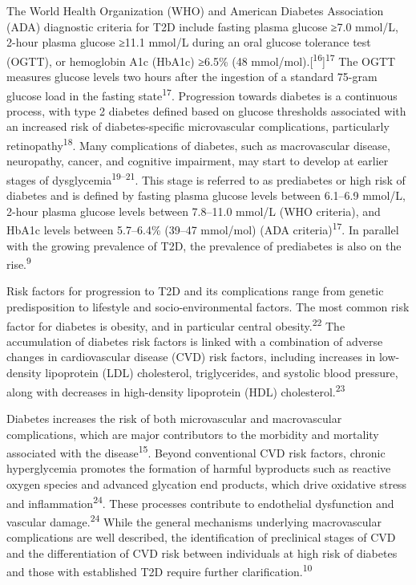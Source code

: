 \documentclass[
  letterpaper,
  headsepline=true,
  open=any]{scrbook}
\begin{document}
The World Health Organization (WHO) and American Diabetes Association
(ADA) diagnostic criteria for T2D include fasting plasma glucose ≥7.0
mmol/L, 2-hour plasma glucose ≥11.1 mmol/L during an oral glucose
tolerance test (OGTT), or hemoglobin A1c (HbA1c) ≥6.5\% (48
mmol/mol).{[}\textsuperscript{16}{]}\textsuperscript{17} The OGTT
measures glucose levels two hours after the ingestion of a standard
75-gram glucose load in the fasting state\textsuperscript{17}.
Progression towards diabetes is a continuous process, with type 2
diabetes defined based on glucose thresholds associated with an
increased risk of diabetes-specific microvascular complications,
particularly retinopathy\textsuperscript{18}. Many complications of
diabetes, such as macrovascular disease, neuropathy, cancer, and
cognitive impairment, may start to develop at earlier stages of
dysglycemia\textsuperscript{19--21}. This stage is referred to as
prediabetes or high risk of diabetes and is defined by fasting plasma
glucose levels between 6.1--6.9 mmol/L, 2-hour plasma glucose levels
between 7.8--11.0 mmol/L (WHO criteria), and HbA1c levels between
5.7--6.4\% (39--47 mmol/mol) (ADA criteria)\textsuperscript{17}. In
parallel with the growing prevalence of T2D, the prevalence of
prediabetes is also on the rise.\textsuperscript{9}

Risk factors for progression to T2D and its complications range from
genetic predisposition to lifestyle and socio-environmental factors. The
most common risk factor for diabetes is obesity, and in particular
central obesity.\textsuperscript{22} The accumulation of diabetes risk
factors is linked with a combination of adverse changes in
cardiovascular disease (CVD) risk factors, including increases in
low-density lipoprotein (LDL) cholesterol, triglycerides, and systolic
blood pressure, along with decreases in high-density lipoprotein (HDL)
cholesterol.\textsuperscript{23}

Diabetes increases the risk of both microvascular and macrovascular
complications, which are major contributors to the morbidity and
mortality associated with the disease\textsuperscript{15}. Beyond
conventional CVD risk factors, chronic hyperglycemia promotes the
formation of harmful byproducts such as reactive oxygen species and
advanced glycation end products, which drive oxidative stress and
inflammation\textsuperscript{24}. These processes contribute to
endothelial dysfunction and vascular damage.\textsuperscript{24} While
the general mechanisms underlying macrovascular complications are well
described, the identification of preclinical stages of CVD and the
differentiation of CVD risk between individuals at high risk of diabetes
and those with established T2D require further
clarification.\textsuperscript{10}
\end{document}
